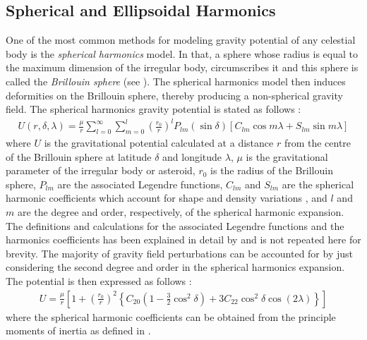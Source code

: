 \subsection{Spherical and Ellipsoidal Harmonics}
\label{subsec:spherical_ellipsoidal_harmonics}
One of the most common methods for modeling gravity potential of any celestial body is the \textit{spherical harmonics} model. In that, a sphere whose radius is equal to the maximum dimension of the irregular body, circumscribes it and this sphere is called the \textit{Brillouin sphere} (see ). The spherical harmonics model then induces deformities on the Brillouin sphere, thereby producing a non-spherical gravity field. The spherical harmonics gravity potential is stated as follows \parencite{scheeresBook}:
\begin{align}
    U(r, \delta, \lambda) = \frac{\mu}{r} \sum_{l=0}^{\infty} \sum_{m=0}^{l} \left(\frac{r_0}{r}\right)^l P_{lm} (\sin\delta) [C_{lm}\cos m\lambda + S_{lm}\sin m\lambda]
    \label{eqn:spherical_harmonics_general}
\end{align}
where $U$ is the gravitational potential calculated at a distance $r$ from the centre of the Brillouin sphere at latitude $\delta$ and longitude $\lambda$, $\mu$ is the gravitational parameter of the irregular body or asteroid, $r_0$ is the radius of the Brillouin sphere, $P_{lm}$ are the associated Legendre functions, $C_{lm}$ and $S_{lm}$ are the spherical harmonic coefficients which account for shape and density variations \parencite{romain2001ellipsoidal}, and $l$ and $m$ are the degree and order, respectively, of the spherical harmonic expansion. The definitions and calculations for the associated Legendre functions and the harmonics coefficients has been explained in detail by \cite{scheeresBook} and is not repeated here for brevity. The majority of gravity field perturbations can be accounted for by just considering the second degree and order in the spherical harmonics expansion. The potential is then expressed as follows \parencite{scheeresBook}:
\begin{align}
    U = \frac{\mu}{r} \left[ 1 + \left(\frac{r_0}{r}\right)^2 \left\{C_{20} \left(1-\frac{3}{2}\cos^2\delta\right) + 3C_{22}\cos^2\delta \cos(2\lambda) \right\} \right]
    \label{eqn:spherical_harmonics_second_degree}
\end{align}
where the spherical harmonic coefficients can be obtained from the principle moments of inertia as defined in \cite{scheeresBook}.
